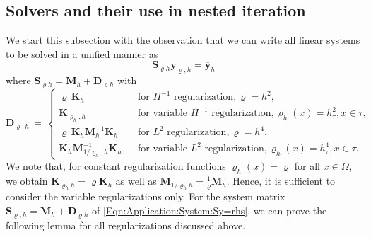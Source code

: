 \documentclass{article}
\numberwithin{equation}{section}
\begin{document}
\subsection{Solvers and their use in nested iteration}
\label{Subsection:Application:EnergyRegularisation:NestedIteration}
We start this subsection with the observation that we can write all linear
systems to be solved in a unified manner as
\begin{equation}
\label{Eqn:Application:System:Sy=rhs}
 \mathbf{S}_{\varrho h}\mathbf{y}_{\varrho,h} = \overline{\mathbf{y}}_h
\end{equation}
where $\mathbf{S}_{\varrho h} = \mathbf{M}_h + \mathbf{D}_{\varrho h}$ with
\[
  \mathbf{D}_{\varrho,h}  \, = \,
  \left \{
    \begin{array}{ccl}
      \varrho \, \mathbf{K}_h
        & & \mbox{for $H^{-1}$ regularization}, \varrho = h^2, \\[1mm]
      \mathbf{K}_{\varrho_h,h}
      & & \mbox{for variable $H^{-1}$ regularization},
          \varrho_h(x) = h_\tau^2, x \in \tau, \\[1mm]
      \varrho \, \mathbf{K}_h \mathbf{M}_h^{-1} \mathbf{K}_h
      & & \mbox{for $L^2$ regularization}, \varrho=h^4, \\[1mm]
      \mathbf{K}_h \mathbf{M}_{1/\varrho_h,h}^{-1} \mathbf{K}_h
      && \mbox{for variable $L^2$ regularization},
         \varrho_h(x) = h_\tau^4, x \in \tau .
    \end{array}
  \right.
\]
We note that, for constant regularization functions
$\varrho_h(x) = \varrho$ for all $x \in \Omega$, we obtain
$\mathbf{K}_{\varrho_h h} = \varrho \mathbf{K}_h$ as well as
$\mathbf{M}_{1/\varrho_h h} = \frac{1}{\varrho} \mathbf{M}_h$. Hence, it is
sufficient to consider the variable regularizations only. For the system
matrix $\mathbf{S}_{\varrho,h} = \mathbf{M}_h + \mathbf{D}_{\varrho h}$ of
\eqref{Eqn:Application:System:Sy=rhs}, we can prove the following lemma for
all regularizations discussed above.
\end{document}
